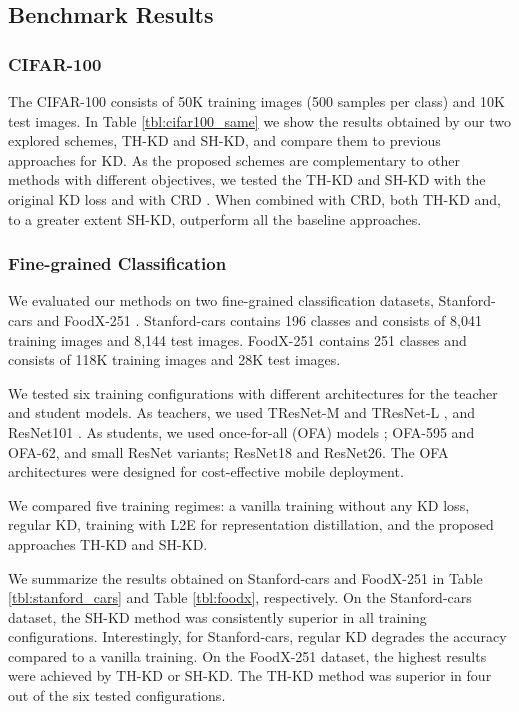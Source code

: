 \subsection{Benchmark Results}
\subsubsection{CIFAR-100}

The CIFAR-100 \cite{krizhevsky2009learning} consists of 50K training images (500 samples per class) and 10K test images. In 
Table \ref{tbl:cifar100_same} we show the results obtained by our two explored schemes, TH-KD and SH-KD, and compare them to previous approaches for KD. 
As the proposed schemes are complementary to other methods with different objectives, we tested the TH-KD and SH-KD with the original KD loss and with CRD \cite{tian2020contrastive}. When combined with CRD, both TH-KD and, to a greater extent SH-KD, outperform all the baseline approaches.

\subsubsection{Fine-grained Classification}
We evaluated our methods on two fine-grained classification datasets, Stanford-cars \cite{stanford_cars_2013} and FoodX-251 \cite{foodx_dataset_2019}.
Stanford-cars contains 196 classes and consists of 8,041 training images and 8,144 test images. FoodX-251 \cite{foodx_dataset_2019} contains 251 classes and consists of 118K training images and 28K test images.

We tested six training configurations with different architectures for the teacher and student models. As teachers, we used TResNet-M and TResNet-L \cite{ridnik2020TResNet}, and ResNet101 \cite{resnet_2015}.
As students, we used once-for-all (OFA) models \cite{ofa_2020}; OFA-595 and OFA-62, and small ResNet variants; ResNet18 and ResNet26.
The OFA architectures were designed for cost-effective mobile deployment.

We compared five training regimes: a vanilla training without any KD loss, regular KD, training with L2E for representation distillation, and the proposed approaches TH-KD and SH-KD.

We summarize the results obtained on Stanford-cars and FoodX-251 in Table \ref{tbl:stanford_cars} and Table \ref{tbl:foodx}, respectively. 
On the Stanford-cars dataset, the SH-KD method was consistently superior in all training configurations. Interestingly, for Stanford-cars, regular KD degrades the accuracy compared to a vanilla training. On the FoodX-251 dataset, the highest results were achieved by TH-KD or SH-KD. The TH-KD method was superior in four out of the six tested configurations.


